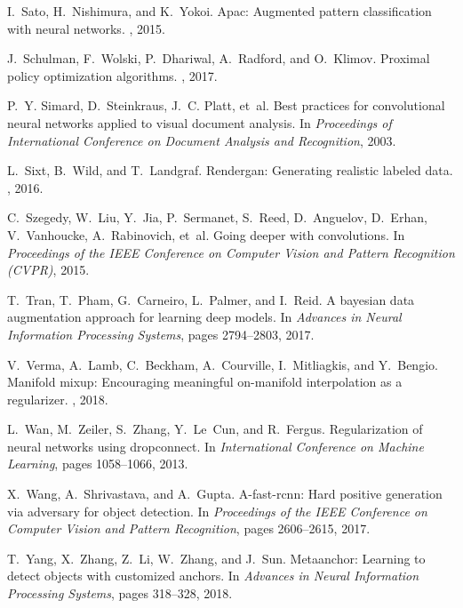 \documentclass[10pt,twocolumn,letterpaper]{article}
\begin{document}
\begin{thebibliography}{10}
I.~Sato, H.~Nishimura, and K.~Yokoi.
\newblock Apac: Augmented pattern classification with neural networks.
, 2015.

J.~Schulman, F.~Wolski, P.~Dhariwal, A.~Radford, and O.~Klimov.
\newblock Proximal policy optimization algorithms.
, 2017.

P.~Y. Simard, D.~Steinkraus, J.~C. Platt, et~al.
\newblock Best practices for convolutional neural networks applied to visual
  document analysis.
\newblock In {\em Proceedings of International Conference on Document Analysis
  and Recognition}, 2003.

L.~Sixt, B.~Wild, and T.~Landgraf.
\newblock Rendergan: Generating realistic labeled data.
, 2016.

C.~Szegedy, W.~Liu, Y.~Jia, P.~Sermanet, S.~Reed, D.~Anguelov, D.~Erhan,
  V.~Vanhoucke, A.~Rabinovich, et~al.
\newblock Going deeper with convolutions.
\newblock In {\em Proceedings of the IEEE Conference on Computer Vision and
  Pattern Recognition (CVPR)}, 2015.

T.~Tran, T.~Pham, G.~Carneiro, L.~Palmer, and I.~Reid.
\newblock A bayesian data augmentation approach for learning deep models.
\newblock In {\em Advances in Neural Information Processing Systems}, pages
  2794--2803, 2017.

V.~Verma, A.~Lamb, C.~Beckham, A.~Courville, I.~Mitliagkis, and Y.~Bengio.
\newblock Manifold mixup: Encouraging meaningful on-manifold interpolation as a
  regularizer.
, 2018.

L.~Wan, M.~Zeiler, S.~Zhang, Y.~Le~Cun, and R.~Fergus.
\newblock Regularization of neural networks using dropconnect.
\newblock In {\em International Conference on Machine Learning}, pages
  1058--1066, 2013.

X.~Wang, A.~Shrivastava, and A.~Gupta.
\newblock A-fast-rcnn: Hard positive generation via adversary for object
  detection.
\newblock In {\em Proceedings of the IEEE Conference on Computer Vision and
  Pattern Recognition}, pages 2606--2615, 2017.

T.~Yang, X.~Zhang, Z.~Li, W.~Zhang, and J.~Sun.
\newblock Metaanchor: Learning to detect objects with customized anchors.
\newblock In {\em Advances in Neural Information Processing Systems}, pages
  318--328, 2018.


\end{thebibliography}
\end{document}
